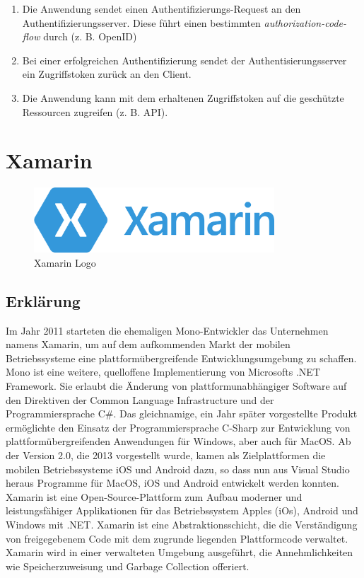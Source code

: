 \begin{enumerate}
    \item Die Anwendung sendet einen Authentifizierungs-Request an den Authentifizierungsserver. Diese führt einen bestimmten \textit{authorization-code-flow} durch (z. B. OpenID)
    \item Bei einer erfolgreichen Authentifizierung sendet der Authentisierungsserver ein Zugriffstoken zurück an den Client.
    \item Die Anwendung kann mit dem erhaltenen Zugriffstoken auf die geschützte Ressourcen zugreifen (z. B. API).
\end{enumerate}
\newpage

\section{Xamarin}
\cite{XML}
\begin{figure}[h]
    \begin{center}
        \includegraphics*[width=9cm]{pics/Xamarin_logo.png}
        \caption[Xamarin Logo]{Xamarin Logo \cite{XMLlogo}}
    \end{center}
\end{figure}
\subsection*{Erklärung}
Im Jahr 2011 starteten die ehemaligen Mono-Entwickler das Unternehmen 
namens Xamarin, um auf dem aufkommenden Markt der mobilen Betriebssysteme 
eine plattformübergreifende Entwicklungsumgebung zu schaffen. 
Mono ist eine weitere, quelloffene Implementierung von Microsofts .NET Framework. 
Sie erlaubt die Änderung von plattformunabhängiger Software auf den Direktiven 
der Common Language Infrastructure und der Programmiersprache C\#.
Das gleichnamige, ein Jahr später vorgestellte Produkt ermöglichte den 
Einsatz der Programmiersprache C-Sharp zur Entwicklung von 
plattformübergreifenden Anwendungen für Windows, aber auch für MacOS. 
Ab der Version 2.0, die 2013 vorgestellt wurde, kamen als Zielplattformen 
die mobilen Betriebssysteme iOS und Android dazu, so dass nun aus Visual 
Studio heraus Programme für MacOS, iOS und Android entwickelt werden 
konnten. 
Xamarin ist eine Open-Source-Plattform zum Aufbau moderner 
und leistungsfähiger Applikationen für das Betriebssystem Apples (iOs), 
Android und Windows mit .NET. Xamarin ist eine Abstraktionsschicht, 
die die Verständigung von freigegebenem Code mit dem zugrunde liegenden 
Plattformcode verwaltet. Xamarin wird in einer verwalteten Umgebung 
ausgeführt, die Annehmlichkeiten wie Speicherzuweisung und Garbage 
Collection offeriert.
